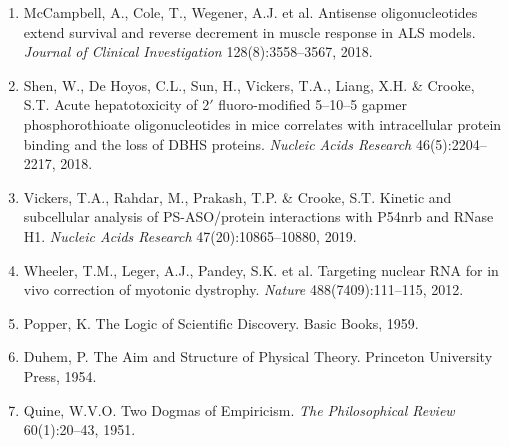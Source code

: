 \documentclass[11pt]{article}
\begin{document}
\begin{enumerate}[leftmargin=2em,itemsep=3pt]
\item McCampbell, A., Cole, T., Wegener, A.J. et al. Antisense oligonucleotides extend survival and reverse decrement in muscle response in ALS models. \textit{Journal of Clinical Investigation} 128(8):3558--3567, 2018.
\item Shen, W., De Hoyos, C.L., Sun, H., Vickers, T.A., Liang, X.H. \& Crooke, S.T. Acute hepatotoxicity of 2$'$ fluoro-modified 5--10--5 gapmer phosphorothioate oligonucleotides in mice correlates with intracellular protein binding and the loss of DBHS proteins. \textit{Nucleic Acids Research} 46(5):2204--2217, 2018.
\item Vickers, T.A., Rahdar, M., Prakash, T.P. \& Crooke, S.T. Kinetic and subcellular analysis of PS-ASO/protein interactions with P54nrb and RNase H1. \textit{Nucleic Acids Research} 47(20):10865--10880, 2019.
\item Wheeler, T.M., Leger, A.J., Pandey, S.K. et al. Targeting nuclear RNA for in vivo correction of myotonic dystrophy. \textit{Nature} 488(7409):111--115, 2012.
\item Popper, K. The Logic of Scientific Discovery. Basic Books, 1959.
\item Duhem, P. The Aim and Structure of Physical Theory. Princeton University Press, 1954.
\item Quine, W.V.O. Two Dogmas of Empiricism. \textit{The Philosophical Review} 60(1):20--43, 1951.
\end{enumerate}
\end{document}

